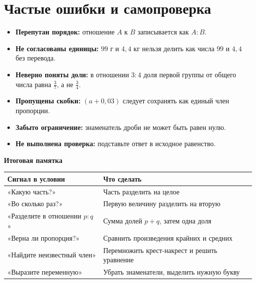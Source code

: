 \documentclass[a4paper,12pt]{article}
\begin{document}
\section{Частые ошибки и самопроверка}
\begin{itemize}
\item \textbf{Перепутан порядок:} отношение $A$ к $B$ записывается как $A:B$.
\item \textbf{Не согласованы единицы:} $99$ г и $4{,}4$ кг нельзя делить как числа $99$ и $4{,}4$ без перевода.
\item \textbf{Неверно поняты доли:} в отношении $3:4$ доля первой группы от общего числа равна $\frac{3}{7}$, а не $\frac34$.
\item \textbf{Пропущены скобки:} $(a+0{,}03)$ следует сохранять как единый член пропорции.
\item \textbf{Забыто ограничение:} знаменатель дроби не может быть равен нулю.
\item \textbf{Не выполнена проверка:} подставьте ответ в исходное равенство.
\end{itemize}
\textcolor{darkaccent}{\textbf{Итоговая памятка}}\par
\begin{tabularx}{\linewidth}{@{}X X@{}}
\toprule
Сигнал в условии & Что сделать\\
\midrule
«Какую часть?» & Часть разделить на целое\\
«Во сколько раз?» & Первую величину разделить на вторую\\
«Разделите в отношении $p:q$» & Сумма долей $p+q$, затем одна доля\\
«Верна ли пропорция?» & Сравнить произведения крайних и средних\\
«Найдите неизвестный член» & Перемножить крест-накрест и решить уравнение\\
«Выразите переменную» & Убрать знаменатели, выделить нужную букву\\
\bottomrule
\end{tabularx}

\clearpage
\end{document}
